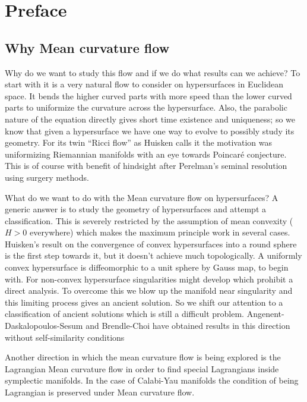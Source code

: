 \chapter{Preface}

\section*{Why Mean curvature flow}

Why do we want to study this flow and if we do what results can we achieve? To start with it is a very natural flow to consider on hypersurfaces in Euclidean space. It bends the higher curved parts with more speed than the lower curved parts to uniformize the curvature across the hypersurface. Also, the parabolic nature of the equation directly gives short time existence and uniqueness; so we know that given a hypersurface we have one way to evolve to possibly study its geometry. For its twin ``Ricci flow'' as Huisken calls it the motivation was uniformizing Riemannian manifolds with an eye towards Poincar\'e conjecture. This is of course with benefit of hindsight after Perelman's seminal resolution using surgery methods. 

What do we want to do with the Mean curvature flow on hypersurfaces? A generic answer is to study the geometry of hypersurfaces and attempt a classification. This is severely restricted by the assumption of mean convexity ($ H>0 $ everywhere) which makes the maximum principle work in several cases. Huisken's result on the convergence of convex hypersurfaces into a round sphere is the first step towards it, but it doesn't achieve much topologically. A uniformly convex hypersurface is diffeomorphic to a unit sphere by Gauss map, to begin with. For non-convex hypersurface singularities might develop which prohibit a direct analysis. To overcome this we blow up the manifold near singularity and this limiting process gives an ancient solution. So we shift our attention to a classification of ancient solutions which is still a difficult problem. Angenent-Daskalopoulos-Sesum and Brendle-Choi have obtained results in this direction without self-similarity conditions

Another direction in which the mean curvature flow is being explored is the Lagrangian Mean curvature flow in order to find special Lagrangians inside symplectic manifolds. In the case of Calabi-Yau manifolds the condition of being Lagrangian is preserved under Mean curvature flow.


